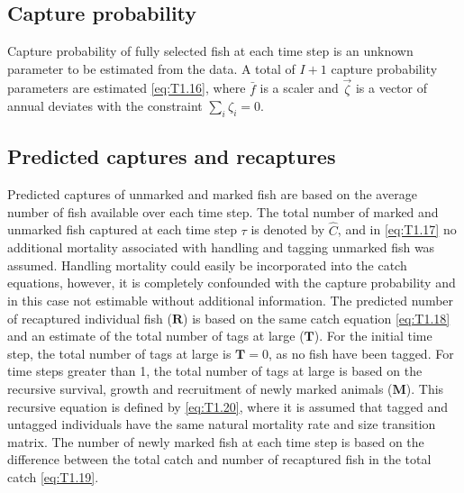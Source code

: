 \subsection{Capture probability} %
\label{sub:capture_probability}
Capture probability of fully selected fish at each time step is an unknown parameter to be estimated from the data.  A total of $I+1$ capture probability parameters are estimated \eqref{eq:T1.16}, where $\bar{f}$ is a scaler and $\vec{\zeta}$ is a vector of annual deviates with the constraint $\sum_i \zeta_i = 0$. 

\subsection{Predicted captures and recaptures} %
\label{sub:predicted_captures_and_recaptures}
Predicted captures of unmarked and marked fish are based on the average number of fish available over each time step.  The total number of marked and unmarked fish captured at each time step $\tau$ is denoted by $\hat{C}$, and in \eqref{eq:T1.17} no additional mortality associated with handling and tagging unmarked fish was assumed. Handling mortality could easily be incorporated into the catch equations, however, it is completely confounded with the capture probability and in this case not estimable without additional information.  The predicted number of recaptured individual fish ($\mathbf{R}$) is based on the same catch equation \ref{eq:T1.18} and an estimate of the total number of tags at large ($\mathbf{T}$).  For the initial time step, the total number of tags at large is $\mathbf{T}=0$, as no fish have been tagged.  For time steps greater than 1, the total number of tags at large is based on the recursive survival, growth and recruitment of newly marked animals ($\mathbf{M}$).  This recursive equation is defined by \eqref{eq:T1.20}, where it is assumed that tagged and untagged individuals have the same natural mortality rate and size transition matrix.  The number of newly marked fish at each time step is based on the difference between the total catch and number of recaptured fish in the total catch \eqref{eq:T1.19}.

